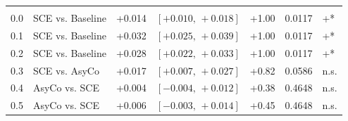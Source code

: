 \begin{table}[h!]
\begin{tabular}{llrrrrl}
\addlinespace
\multicolumn{7}{l}{\textit{Macro AUC}} \\
0.0 & SCE vs. Baseline & +0.014 & $[+0.010,\,+0.018]$ & +1.00 & 0.0117 & +* \\
0.1 & SCE vs. Baseline & +0.032 & $[+0.025,\,+0.039]$ & +1.00 & 0.0117 & +* \\
0.2 & SCE vs. Baseline & +0.028 & $[+0.022,\,+0.033]$ & +1.00 & 0.0117 & +* \\
0.3 & SCE vs. AsyCo & +0.017 & $[+0.007,\,+0.027]$ & +0.82 & 0.0586 & n.s. \\
0.4 & AsyCo vs. SCE & +0.004 & $[-0.004,\,+0.012]$ & +0.38 & 0.4648 & n.s. \\
0.5 & AsyCo vs. SCE & +0.006 & $[-0.003,\,+0.014]$ & +0.45 & 0.4648 & n.s. \\
\bottomrule
\end{tabular}
\end{table}

